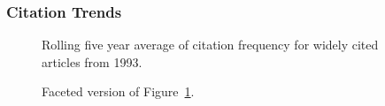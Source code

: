 \documentclass[
  10pt,
  letterpaper,
  DIV=11,
  numbers=noendperiod,
  twoside]{scrartcl}
\begin{document}
\subsubsection*{Citation Trends}\label{sec-trends-1993}

\begin{figure}


\caption{\label{fig-citation-spaghetti-1993}Rolling five year average of
citation frequency for widely cited articles from 1993.}

\end{figure}%

\begin{figure}


\caption{\label{fig-citation-facet-1993}Faceted version of
Figure~\ref{fig-citation-spaghetti-1993}.}

\end{figure}%
\end{document}
